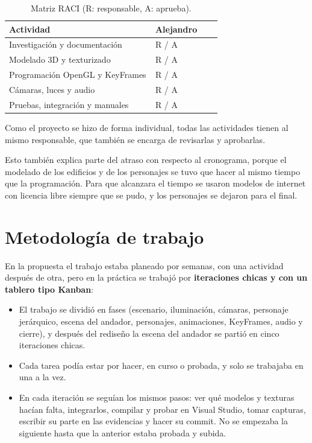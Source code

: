 \documentclass[11pt,a4paper]{article}
\begin{document}
\begin{table}[H]
  \centering
  \small
  \begin{tabular}{|p{0.5\linewidth}|>{\centering\arraybackslash}p{0.2\linewidth}|}
    \hline
    \textbf{Actividad} & \textbf{Alejandro} \\ \hline
    Investigación y documentación & R / A \\ \hline
    Modelado 3D y texturizado & R / A \\ \hline
    Programación OpenGL y KeyFrames & R / A \\ \hline
    Cámaras, luces y audio & R / A \\ \hline
    Pruebas, integración y manuales & R / A \\ \hline
  \end{tabular}
  \caption{Matriz RACI (R: responsable, A: aprueba).}
\end{table}

Como el proyecto se hizo de forma individual, todas las actividades tienen al mismo responsable, que también se encarga de revisarlas y aprobarlas.

Esto también explica parte del atraso con respecto al cronograma, porque el modelado de los edificios y de los personajes se tuvo que hacer al mismo tiempo que la programación. Para que alcanzara el tiempo se usaron modelos de internet con licencia libre siempre que se pudo, y los personajes se dejaron para el final.

\section{Metodología de trabajo}

En la propuesta el trabajo estaba planeado por semanas, con una actividad después de otra, pero en la práctica se trabajó por \textbf{iteraciones chicas y con un tablero tipo Kanban}:

\begin{itemize}
  \item El trabajo se dividió en fases (escenario, iluminación, cámaras, personaje jerárquico, escena del andador, personajes, animaciones, KeyFrames, audio y cierre), y después del rediseño la escena del andador se partió en cinco iteraciones chicas.
  \item Cada tarea podía estar por hacer, en curso o probada, y solo se trabajaba en una a la vez.
  \item En cada iteración se seguían los mismos pasos: ver qué modelos y texturas hacían falta, integrarlos, compilar y probar en Visual Studio, tomar capturas, escribir su parte en las evidencias y hacer su commit. No se empezaba la siguiente hasta que la anterior estaba probada y subida.
\end{itemize}
\end{document}
